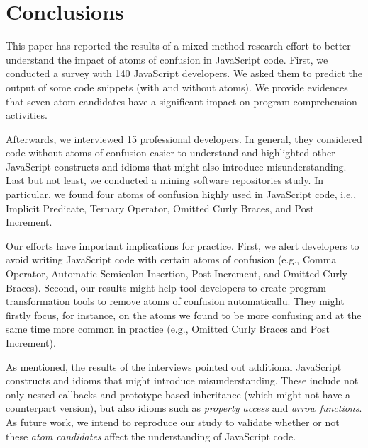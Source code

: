 \section{Conclusions}
\label{conclusion}

This paper has reported the results of a mixed-method research effort to better understand the impact of atoms of confusion in JavaScript code. First, we conducted a survey with 140 JavaScript developers. We asked them to predict the output of some code snippets (with and without atoms). We provide evidences that seven atom candidates have a significant impact on program comprehension activities.

Afterwards, we interviewed 15 professional developers. In general, they considered code without atoms of confusion easier to understand and highlighted other JavaScript constructs and idioms that might also introduce misunderstanding. Last but not least, we conducted a mining software repositories study. In particular, we found four atoms of confusion highly used in JavaScript code, i.e., Implicit Predicate, Ternary Operator, Omitted Curly Braces, and Post Increment.

Our efforts have important implications for practice. First, we alert developers to avoid writing JavaScript code with certain atoms of confusion (e.g., Comma Operator, Automatic Semicolon Insertion, Post Increment, and Omitted Curly Braces). Second, our results might help tool developers to create program transformation tools to remove atoms of confusion automaticallu. They might firstly focus, for instance, on the atoms we found to be more confusing and at the same time more common in practice (e.g., Omitted Curly Braces and Post Increment).

As mentioned, the results of the interviews pointed out additional JavaScript constructs and idioms
that might introduce misunderstanding. These include not only nested callbacks and prototype-based
inheritance (which might not have a counterpart version), but also idioms such
as \emph{property access} and \emph{arrow functions}. As future work, we intend to
reproduce our study to validate whether or not these \emph{atom candidates} affect
the understanding of JavaScript code. 

